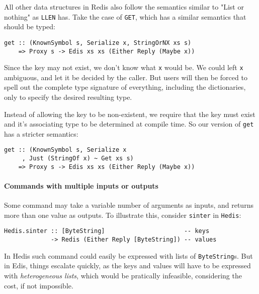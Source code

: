 \documentclass[pldi]{sigplanconf-pldi16}
\begin{document}
All other data structures in Redis also follow the semantics similar to
 "List or nothing" as \texttt{LLEN} has. Take the case of
 \texttt{GET}, which has a similar semantics that should be typed:

\begin{verbatim}
get :: (KnownSymbol s, Serialize x, StringOrNX xs s)
    => Proxy s -> Edis xs xs (Either Reply (Maybe x))
\end{verbatim}

Since the key may not exist, we don't know what \texttt{x} would
be. We could left \texttt{x} ambiguous, and let it be decided by
 the caller. But users will then be forced to spell out the complete
type signature of everything, including the dictionaries, only to specify
the desired resulting type.

Instead of allowing the key to be non-existent, we require that the key must
 exist and it's associating type to be determined at compile time. So our
 version of \texttt{get} has a stricter semantics:

\begin{verbatim}
get :: (KnownSymbol s, Serialize x
     , Just (StringOf x) ~ Get xs s)
    => Proxy s -> Edis xs xs (Either Reply (Maybe x))
\end{verbatim}

\paragraph{Commands with multiple inputs or outputs}

Some command may take a variable number of arguments as inputs, and returns more
 than one value as outputs. To illustrate this, consider
 \texttt{sinter} in \texttt{Hedis}:

\begin{verbatim}
Hedis.sinter :: [ByteString]                      -- keys
             -> Redis (Either Reply [ByteString]) -- values
\end{verbatim}

In Hedis such command could easily be expressed with lists of
 \texttt{ByteString}s. But in Edis, things escalate quickly, as
 the keys and values will have to be expressed with \emph{heterogeneous
 lists}\cite{hetero}, which would be pratically infeasible, considering the cost,
 if not impossible.
\end{document}
